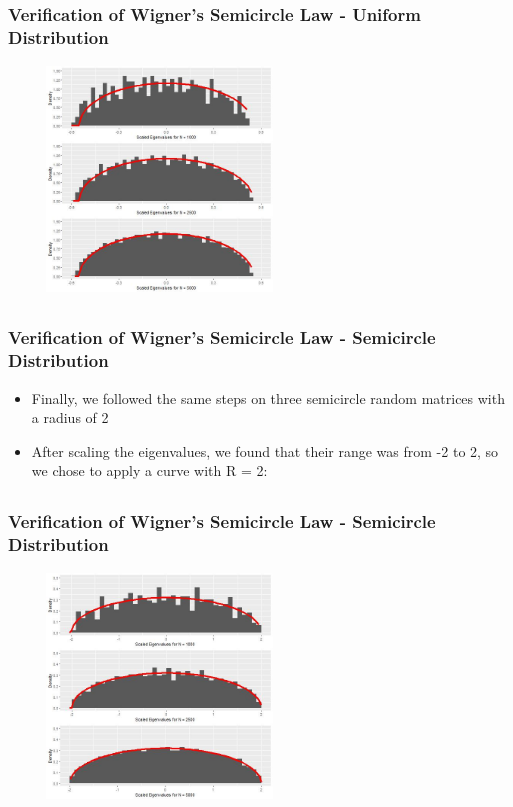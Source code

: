 \documentclass[handout, xcolor=dvipsnames]{beamer}
\begin{document}
\subsection{}
\begin{frame}
	\frametitle{Verification of Wigner's Semicircle Law - Uniform Distribution}
        \begin{center}
            \includegraphics[width=8cm,height=6cm]{Figures/SemiLaw_Unif.jpeg}
        \end{center}
\end{frame}


\subsection{}
\begin{frame}
	\frametitle{Verification of Wigner's Semicircle Law - Semicircle Distribution}
    \begin{itemize}
        \item Finally, we followed the same steps on three semicircle random matrices with a radius of 2
        \item After scaling the eigenvalues, we found that their range was from -2 to 2, so we chose to apply a curve with R = 2:
    \end{itemize}
\end{frame}


\subsection{}
\begin{frame}
	\frametitle{Verification of Wigner's Semicircle Law - Semicircle Distribution}
        \begin{center}
            \includegraphics[width=8cm,height=6cm]{Figures/SemiLaw_Semicircle.jpeg}
        \end{center}
\end{frame}
\end{document}
